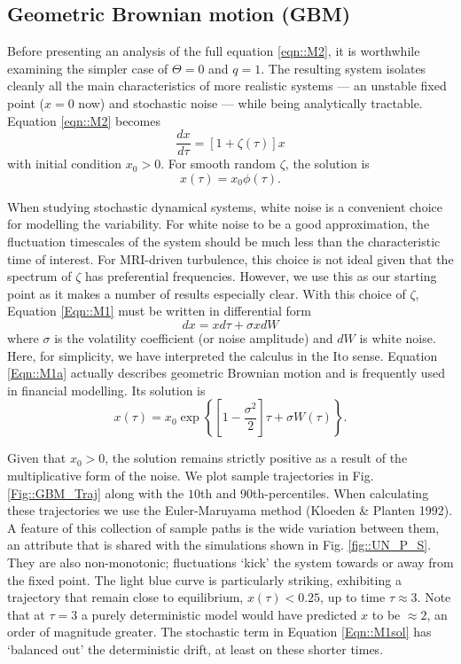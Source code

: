 \documentclass[useAMS]{mn2e}
\begin{document}
\subsection{Geometric Brownian motion (GBM)}

Before presenting an analysis of the full equation \eqref{eqn::M2},
it is worthwhile examining the simpler case of $\Theta=0$ and
$q=1$. The resulting system isolates cleanly all the main characteristics of
more realistic systems --- an unstable fixed point ($x=0$ now) and
stochastic noise --- while being analytically tractable. 
 Equation \eqref{eqn::M2} becomes
\begin{equation}
\frac{dx}{d\tau}=\left[1+\zeta(\tau)\right]x
\label{Eqn::M1}
\end{equation}
with initial condition $x_{0}>0$. For smooth random $\zeta$, the solution is
\begin{equation}
x(\tau)=x_{0}\phi(\tau).
\label{Eqn::GBM_gen}
\end{equation}

When studying stochastic dynamical systems, white noise is a convenient
choice for modelling the variability. For white noise to be a good
approximation, the fluctuation timescales of the system should be much
less than the characteristic time of interest. For MRI-driven
turbulence, this choice is not ideal given that the spectrum of
$\zeta$ has preferential frequencies. However, we use this as our
starting point as it makes a number of results especially clear. With this choice of
$\zeta$, Equation \eqref{Eqn::M1} must be written in differential form
\begin{equation}
dx=xd\tau+\sigma x dW
\label{Eqn::M1a}
\end{equation}
where $\sigma$ is the volatility coefficient (or noise amplitude) 
and $dW$ is white
noise. Here, for simplicity, we have interpreted the calculus in the Ito
sense.
 Equation \eqref{Eqn::M1a} actually describes geometric Brownian motion 
and is frequently used in financial modelling. Its solution is 
\begin{equation}
x(\tau)=x_{0}\exp\left\{\left[1-\frac{\sigma^{2}}{2}\right]\tau+\sigma W(\tau)\right\}.
\label{Eqn::M1sol}
\end{equation}

Given that $x_{0}>0$, the solution remains strictly positive as a
result of the multiplicative form of the noise. We plot sample
trajectories in Fig. \ref{Fig::GBM_Traj} along with the $10$th and
$90$th-percentiles. When
calculating these trajectories we use the Euler-Maruyama method
(Kloeden \& Planten 1992). 
A feature of this collection of sample paths is
the wide variation between them, an attribute that is shared with the
simulations shown in Fig.
\ref{fig::UN_P_S}. They are also non-monotonic; fluctuations
`kick' the system towards or away from the fixed point. 
The light blue curve
 is particularly striking, exhibiting a trajectory that remain close
 to equilibrium,
$x(\tau)<0.25$, up to time $\tau\approx 3$. Note that at $\tau=3$ a
purely deterministic model would have predicted $x$ to be $\approx 2$,
an order of magnitude greater. 
The stochastic term in Equation \eqref{Eqn::M1sol} has
`balanced out' the deterministic drift, at least on these shorter
times.  
\end{document}

